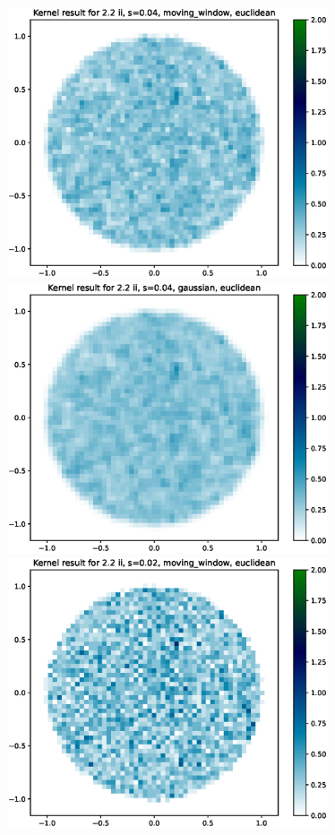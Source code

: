 \documentclass{article}
\begin{document}
\hspace*{-1.5cm}\includegraphics[height=8cm]{comparisons//Kernel_result_2-2ii_s_0-04_moving_window_euclidean.eps} \hspace*{-1.5cm}
\includegraphics[height=8cm]{comparisons//Kernel_result_2-2ii_s_0-04_gaussian_euclidean.eps}  \\
\hspace*{-1.5cm}\includegraphics[height=8cm]{comparisons//Kernel_result_2-2ii_s_0-02_moving_window_euclidean.eps} \hspace*{-1.5cm}
\end{document}
